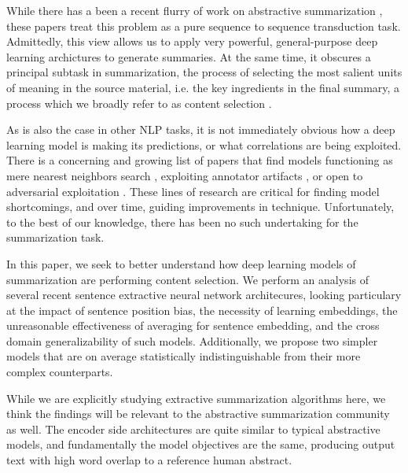 

While there has a been a recent flurry of work on abstractive summarization
\cite{paulus,see,chenglapata,nallapati},
these papers treat this problem as a pure sequence to sequence 
transduction task. Admittedly, this view allows us to apply very powerful, 
general-purpose deep learning archictures to generate summaries.
At the same time, it obscures a principal subtask in summarization, the 
process of selecting the most salient units of meaning in the source material,
i.e. the key ingredients in the final summary, a process which we 
broadly refer to as content selection \cite{possiblyMcKeownAndNenkova}.

As is also the case in other NLP tasks, it is not immediately obvious how a
deep learning model is making its predictions, or what correlations 
are being exploited. There is a concerning and growing list of papers that 
find models functioning as mere nearest neighbors search 
\cite{liang,danqichen}, exploiting annotator artifacts 
\cite{recentNaaclPapersOnSNLI}, or open to adversarial exploitation \cite{findExampleYouNoMemoryDumbDumb}. 
These lines of research are critical for finding model shortcomings, and over
time, guiding improvements in technique. Unfortunately,
to the best of our knowledge, there has been
no such undertaking for the summarization task. 

In this paper, we seek to better understand how deep learning models of 
summarization are performing content selection. We perform an analysis 
of several recent sentence extractive neural network architecures, 
looking particulary at the impact of sentence position bias, the necessity
of learning embeddings, the unreasonable effectiveness of averaging for 
sentence embedding, and the cross domain generalizability of such models.
Additionally, we propose two simpler models that are on average statistically
indistinguishable from their more complex counterparts.

While we are explicitly studying extractive summarization algorithms here,
we think the findings will be relevant to the abstractive summarization 
community as well. The encoder side architectures are quite similar to
typical abstractive models, and fundamentally the model objectives are 
the same, producing output text with high word overlap to a reference human
abstract. 


